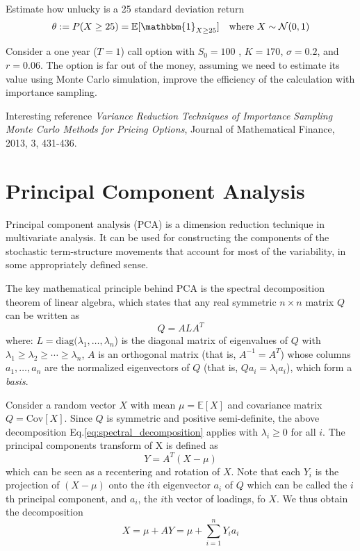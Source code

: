 \documentclass[12pt,a4paper]{article}
\begin{document}
\begin{question}
Estimate how unlucky is a 25 standard deviation return
\begin{equation*}
\theta := P(X\geq 25) = \mathbb{E}[\mathbbm{1}_{X\geq 25}]  \quad\text{where } X\sim \mathcal{N}(0, 1)
\end{equation*}
\end{question}

\begin{question}
Consider a one year ($T=1$) call option with $S_0=100$ , $K=170$,  $\sigma=0.2$, and $r=0.06$. The option is far out of the money, assuming we need to estimate its value using Monte Carlo simulation, improve the efficiency of the calculation with importance sampling.

\noindent
Interesting reference \emph{Variance Reduction Techniques of Importance Sampling Monte Carlo Methods for Pricing Options}, 
Journal of Mathematical Finance, 2013, 3, 431-436.
\end{question}

\clearpage
\section{Principal Component Analysis}
Principal component analysis (PCA) is a dimension reduction technique in multivariate analysis. It can be used for constructing the components of the stochastic term-structure movements that account for most of the variability, in some appropriately defined sense.

The key mathematical principle behind PCA is the spectral decomposition theorem of linear algebra, which states that any real symmetric $n\times n$ matrix $Q$ can be written as
\begin{equation}
Q = ALA^{T}
\label{eq:spectral_decomposition}
\end{equation}
where: $L = \text{diag}(\lambda_1,\ldots, \lambda_n$) is the diagonal matrix of eigenvalues of $Q$ with $\lambda_1 \geq \lambda_2 \geq \cdots \geq \lambda_n$, $A$ is an orthogonal matrix (that is, $A^{-1}=A^{T}$) whose columns $a_1,\ldots, a_n$ are the normalized eigenvectors of $Q$ (that is, $Qa_i = \lambda_i a_i$), which form a \emph{basis}.

Consider a random vector $X$ with mean $\mu = \mathbb{E}[X]$ and covariance matrix $Q = \text{Cov}[X]$. Since $Q$ is symmetric and positive semi-definite,
the above decomposition Eq.\ref{eq:spectral_decomposition} applies with $\lambda_i\geq 0$ for all $i$. The principal components transform of X is defined as
\begin{equation}
Y = A^{T}(X -\mu)
\end{equation}
which can be seen as a recentering and rotation of $X$. Note that each $Y_i$ is the projection of $(X-\mu)$ onto the $i$th eigenvector $a_i$ of $Q$ which can be called the $i$th principal component, and $a_i$, the $i$th vector of loadings, fo $X$. We thus obtain the decomposition
\begin{equation}
X = \mu + AY = \mu + \sum_{i=1}^n Y_i a_i
\end{equation}
\end{document}
